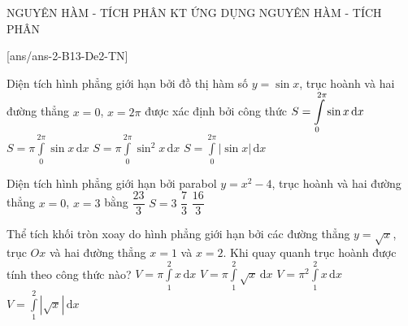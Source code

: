 \begin{name}
	{NGUYÊN HÀM - TÍCH PHÂN}
	{KT ỨNG DỤNG NGUYÊN HÀM - TÍCH PHÂN}
	{\tentruong}
	{\thoigian}
\end{name}
\setcounter{ex}{0}\setcounter{bt}{0}
[ans/ans-2-B13-De2-TN]
\TN
\begin{ex}%
Diện tích hình phẳng giới hạn bởi đồ thị hàm số $y=\sin x$, trục hoành và hai đường thẳng $x=0$, $x=2\pi$ được xác định bởi công thức
	\choice
	{$S=\displaystyle\displaystyle\int\limits_0^{2\pi}\sin x\mathrm{\,d}x$}
	{$S=\pi\displaystyle\int\limits_0^{2\pi}\sin x\mathrm{\,d}x$}
	{$S=\pi\displaystyle\int\limits_0^{2\pi}\sin^2 x\mathrm{\,d}x$}
	{\True $S=\displaystyle\int\limits_0^{2\pi}\left| \sin x \right|\mathrm{\,d}x$}
\end{ex}
\begin{ex}%
Diện tích hình phẳng giới hạn bởi parabol $y=x^2-4$, trục hoành và hai đường thẳng $x=0$, $x=3$ bằng
	\choice
	{\True $\dfrac{23}{3}$}
	{$S=3$}
	{$\dfrac{7}{3}$}
	{$\dfrac{16}{3}$}
\end{ex}
\begin{ex}%
Thể tích khối tròn xoay do hình phẳng giới hạn bởi các đường thẳng $y=\sqrt{x}$, trục $Ox$ và hai đường thẳng $x=1$ và $x=2$. Khi quay quanh trục hoành được tính theo công thức nào?
	\choice
	{\True $V=\pi\displaystyle\int\limits_1^2 x\mathrm{\,d}x$}
	{$V=\pi \displaystyle\int\limits_1^2 \sqrt{x}\mathrm{\,d}x$}
	{$V=\pi^2\displaystyle\int\limits_1^2 x\mathrm{\,d}x$}
	{$V=\displaystyle\int\limits_1^2 \left|\sqrt{x}\right|\mathrm{\,d}x$}
\end{ex}
